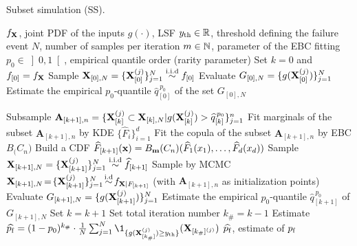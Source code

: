 \begin{algorithm}[h]
    \caption{Subset simulation (SS).}\label{alg:ss}
    \footnotesize
    \begin{algorithmic}
        \State $f_{\bf X}$, joint PDF of the inputs
        \State $g(\cdot)$, LSF
        \State $y_\mathrm{th} \in \mathbb{R}$, threshold defining the failure event 
        \State $N$, number of samples per iteration
        \State $m \in \mathbb{N}$, parameter of the EBC fitting
        \State $p_0 \in \left]0, 1\right[$, empirical quantile order (rarity parameter)
        \State Set $k = 0$ and $f_{[0]} = f_{\bf X}$
        \State Sample ${\bf X}_{[0], N} = \{{\bf X}_{[0]}^{(j)}\}_{j=1}^N \overset{\text{i.i.d}}{\sim} f_{[0]}$
        \State Evaluate $G_{[0], N} = \{g({\bf X}_{[0]}^{(j)})\}_{j=1}^N$
        \State Estimate the empirical $p_0$-quantile $\widehat{q}_{[0]}^{\, p_0}$ of the set $G_{[0], N}$
        
        \State Subsample $\mathbf{A}_{[k+1], n}=\{{\bf X}_{[k]}^{(j)} \subset {\bf X}_{[k], N}| g({\bf X}_{[k]}^{(j)}) > \widehat{q}_{[k]}^{\, p_0} \}_{j=1}^n$
        \State Fit marginals of the subset $\mathbf{A}_{[k+1], n}$ by KDE $\{\widehat{F}_i\}_{i=1}^d$
        \State Fit the copula of the subset $\mathbf{A}_{[k+1], n}$ by EBC $B_\bm(C_n)$
        \State Build a CDF $\widehat{F}_{[k+1]}({\bf x}) = B_{\bf m}(C_n)(\widehat{F}_1(x_1), \dots, \widehat{F}_d(x_d))$
        \State Sample ${\bf X}_{[k+1], N} = \{{\bf X}_{[k+1]}^{(j)}\}_{j=1}^N \overset{\text{i.i.d}}{\sim} \widehat{f}_{[k+1]}$
        \State Sample by MCMC ${\bf X}_{[k+1], N} \!=\! \{{\bf X}_{[k+1]}^{(j)}\}_{j=1}^N \!\overset{\text{i.d}}{\sim}\! f_{{\bf X} | F_{[k+1]}}$ (with $\mathbf{A}_{[k+1], n}$ as initialization points)
        \State Evaluate $G_{[k+1], N} = \{g({\bf X}_{[k+1]}^{(j)})\}_{j=1}^N$
        \State Estimate the empirical $p_0$-quantile $\widehat{q}_{[k+1]}^{\, p_0}$ of $G_{[k+1], N}$
        \State Set $k = k+1$
        \EndWhile
        \State Set total iteration number $k_\# = k-1$ 
        \State Estimate $\widehat{\pf} = (1 - p_0)^{k_\#} \cdot \frac{1}{N} \sum_{j=1}^N \1_{\{g(\bX_{[k_\#]}^{(j)}) \geq \yth  \}}(\bX_{[k_\#]^{(j)}}) $
        \State $\widehat{p_\mathrm{f}}$, estimate of $p_\mathrm{f}$
    \end{algorithmic}
    \end{algorithm}












